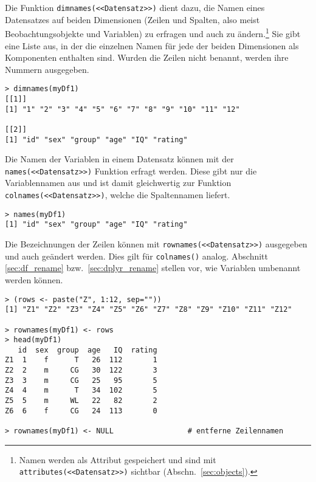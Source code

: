 Die Funktion \lstinline!dimnames(<<Datensatz>>)! dient dazu, die Namen eines Datensatzes auf beiden Dimensionen (Zeilen und Spalten, also meist Beobachtungsobjekte und Variablen) zu erfragen und auch zu ändern.\footnote{Namen werden als Attribut gespeichert und sind mit \lstinline!attributes(<<Datensatz>>)! sichtbar (Abschn.\ \ref{sec:objects}).} Sie gibt eine Liste aus, in der die einzelnen Namen für jede der beiden Dimensionen als Komponenten enthalten sind. Wurden die Zeilen nicht benannt, werden ihre Nummern ausgegeben.
\begin{lstlisting}
> dimnames(myDf1)
[[1]]
[1] "1" "2" "3" "4" "5" "6" "7" "8" "9" "10" "11" "12"

[[2]]
[1] "id" "sex" "group" "age" "IQ" "rating"
\end{lstlisting}

Die Namen der Variablen in einem Datensatz können mit der \lstinline!names(<<Datensatz>>)! Funktion erfragt werden. Diese gibt nur die Variablennamen aus und ist damit gleichwertig zur Funktion \lstinline!colnames(<<Datensatz>>)!, welche die Spaltennamen liefert.
\begin{lstlisting}
> names(myDf1)
[1] "id" "sex" "group" "age" "IQ" "rating"
\end{lstlisting}

Die Bezeichnungen der Zeilen können mit \lstinline!rownames(<<Datensatz>>)! ausgegeben und auch geändert werden. Dies gilt für \lstinline!colnames()! analog. Abschnitt \ref{sec:df_rename} bzw.\ \ref{sec:dplyr_rename} stellen vor, wie Variablen umbenannt werden können.
\begin{lstlisting}
> (rows <- paste("Z", 1:12, sep=""))
[1] "Z1" "Z2" "Z3" "Z4" "Z5" "Z6" "Z7" "Z8" "Z9" "Z10" "Z11" "Z12"

> rownames(myDf1) <- rows
> head(myDf1)
   id  sex  group  age   IQ  rating
Z1  1    f      T   26  112       1
Z2  2    m     CG   30  122       3
Z3  3    m     CG   25   95       5
Z4  4    m      T   34  102       5
Z5  5    m     WL   22   82       2
Z6  6    f     CG   24  113       0

> rownames(myDf1) <- NULL                 # entferne Zeilennamen
\end{lstlisting}

